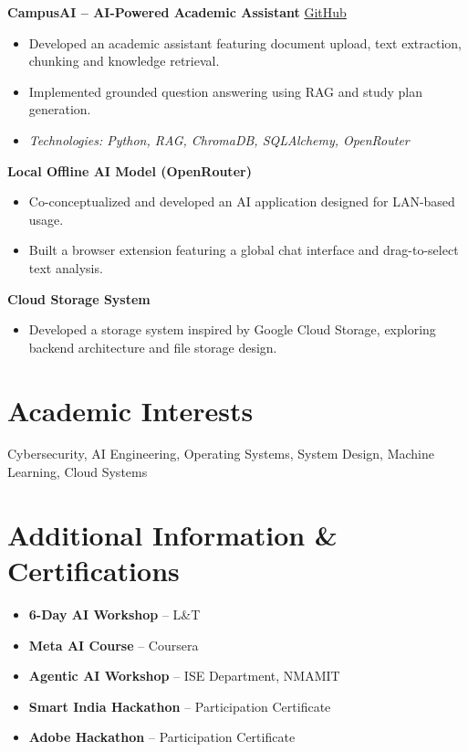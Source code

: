 \documentclass[10pt,a4paper]{article}
\begin{document}
\vspace{2pt}

\noindent
\textbf{CampusAI -- AI-Powered Academic Assistant}
\hfill
\href{https://github.com/PranavBShenoy/Campus-Ai-Assistant}{GitHub}

\begin{itemize}
    \item Developed an academic assistant featuring
    document upload, text extraction, chunking and
    knowledge retrieval.
    \item Implemented grounded question answering
    using RAG and study plan generation.
    \item \textit{Technologies: Python, RAG, ChromaDB,
    SQLAlchemy, OpenRouter}
\end{itemize}

\vspace{2pt}

\noindent
\textbf{Local Offline AI Model (OpenRouter)}

\begin{itemize}
    \item Co-conceptualized and developed an AI
    application designed for LAN-based usage.
    \item Built a browser extension featuring a global
    chat interface and drag-to-select text analysis.
\end{itemize}

\vspace{2pt}

\noindent
\textbf{Cloud Storage System}

\begin{itemize}
    \item Developed a storage system inspired by
    Google Cloud Storage, exploring backend
    architecture and file storage design.
\end{itemize}

\section*{Academic Interests}

Cybersecurity, AI Engineering, Operating Systems,
System Design, Machine Learning, Cloud Systems

\section*{Additional Information \& Certifications}

\begin{itemize}
    \item \textbf{6-Day AI Workshop} -- L\&T
    \item \textbf{Meta AI Course} -- Coursera
    \item \textbf{Agentic AI Workshop} -- ISE Department, NMAMIT
    \item \textbf{Smart India Hackathon} -- Participation Certificate
    \item \textbf{Adobe Hackathon} -- Participation Certificate
\end{itemize}
\end{document}
